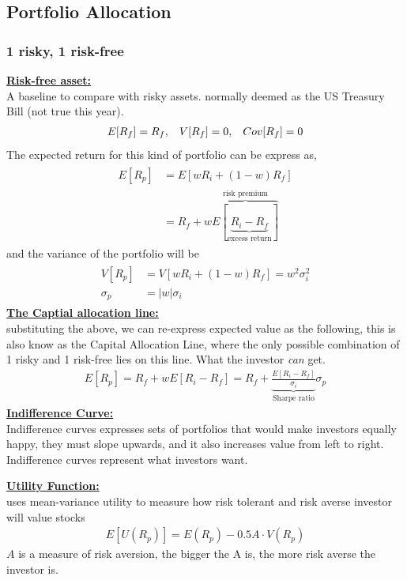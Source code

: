 \begin{multicols}{2}
\subsection{Portfolio Allocation}
\subsubsection{1 risky, 1 risk-free}
\underline{\textbf{Risk-free asset:}}\\
A baseline to compare with risky assets. normally deemed as the US Treasury Bill (not true this year). 
\begin{gather*}
    E[R_f] = R_f,\hspace*{0.3cm}V[R_f] = 0,\hspace*{0.3cm}Cov[R_f] = 0
\end{gather*}
The expected return for this kind of portfolio can be express as,
\begin{gather*}
    \begin{split}
        E[R_p] &= E[wR_i+(1-w)R_f]\\
        &= \boxed{R_f+w\overbrace{E[\underbrace{R_i-R_f}_\text{excess return}]}^\text{risk premium}}
    \end{split}
\end{gather*}
and the variance of the portfolio will be 
\begin{gather*}
    \begin{split}
       V[R_p] &= V[wR_i+(1-w)R_f]= w^2\sigma_i^2\\
        \sigma_p &= \lvert w\rvert\sigma_i
    \end{split}
\end{gather*}
\underline{\textbf{The Captial allocation line:}}\\
substituting the above, we can re-express expected value as the following, this is also know as the Capital Allocation Line, where the only possible combination of 1 risky and 1 risk-free lies on this line. What the investor \textit{can} get.
\begin{gather*}
    E[R_p] = R_f+wE[R_i-R_f] = R_f+\underbrace{\frac{E[R_i-R_f]}{\sigma_i}}_\text{Sharpe ratio}\sigma_p
\end{gather*}
\underline{\textbf{Indifference Curve:}}\\
Indifference curves expresses sets of portfolios that would make investors equally happy, they must slope upwards, and it also increases value from left to right. Indifference curves represent what investors want.

\underline{\textbf{Utility Function:}}\\
uses mean-variance utility to measure how risk tolerant and risk averse investor will value stocks
\begin{gather*}
    E[U(R_p)] = E(R_p)-0.5A\cdot V(R_p)
\end{gather*}
$A$ is a measure of risk aversion, the bigger the A is, the more risk averse the investor is. 


\end{multicols}
